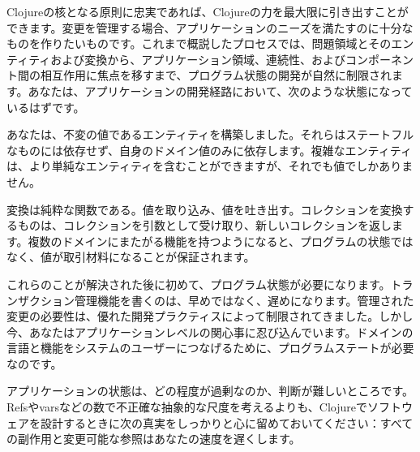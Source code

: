 Clojureの核となる原則に忠実であれば、Clojureの力を最大限に引き出すことができます。変更を管理する場合、アプリケーションのニーズを満たすのに十分なものを作りたいものです。これまで概説したプロセスでは、問題領域とそのエンティティおよび変換から、アプリケーション領域、連続性、およびコンポーネント間の相互作用に焦点を移すまで、プログラム状態の開発が自然に制限されます。あなたは、アプリケーションの開発経路において、次のような状態になっているはずです。

あなたは、不変の値であるエンティティを構築しました。それらはステートフルなものには依存せず、自身のドメイン値のみに依存します。複雑なエンティティは、より単純なエンティティを含むことができますが、それでも値でしかありません。

変換は純粋な関数である。値を取り込み、値を吐き出す。コレクションを変換するものは、コレクションを引数として受け取り、新しいコレクションを返します。複数のドメインにまたがる機能を持つようになると、プログラムの状態ではなく、値が取引材料になることが保証されます。

これらのことが解決された後に初めて、プログラム状態が必要になります。トランザクション管理機能を書くのは、早めではなく、遅めになります。管理された変更の必要性は、優れた開発プラクティスによって制限されてきました。しかし今、あなたはアプリケーションレベルの関心事に忍び込んでいます。ドメインの言語と機能をシステムのユーザーにつなげるために、プログラムステートが必要なのです。

アプリケーションの状態は、どの程度が過剰なのか、判断が難しいところです。Refsやvarsなどの数で不正確な抽象的な尺度を考えるよりも、Clojureでソフトウェアを設計するときに次の真実をしっかりと心に留めておいてください：すべての副作用と変更可能な参照はあなたの速度を遅くします。

